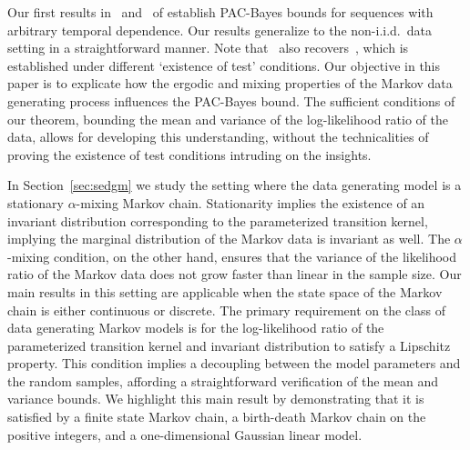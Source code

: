 \documentclass[11pt]{amsart}
\begin{document}
Our first results in~ and~ of  establish PAC-Bayes bounds for sequences with arbitrary temporal dependence. Our results generalize \cite[Theorem 2.4]{pierre} to the non-i.i.d.\ data setting in a straightforward manner. Note that~ also recovers~\cite[Theorem 3.3]{bhatta}, which is established under different `existence of test' conditions. Our objective in this paper is to explicate how the ergodic and mixing properties of the Markov data generating process influences the PAC-Bayes bound. The sufficient conditions of our theorem, bounding the mean and variance of the log-likelihood ratio of the data, allows for developing this understanding, without the technicalities of proving the existence of test conditions intruding on the insights. 

In Section~\ref{sec:sedgm} we study the setting where the data generating model is a stationary $\alpha$-mixing Markov chain. Stationarity implies the existence of an invariant distribution corresponding to the parameterized transition kernel, implying the marginal distribution of the Markov data is invariant as well. The $\alpha$-mixing condition, on the other hand, ensures that the variance of the likelihood ratio of the Markov data does not grow faster than linear in the sample size. Our main results in this setting are applicable when the state space of the Markov chain is either continuous or discrete. The primary requirement on the class of data generating Markov models is for the log-likelihood ratio of the parameterized transition kernel and invariant distribution to satisfy a Lipschitz property. This condition implies a decoupling between the model parameters and the random samples, affording a straightforward verification of the mean and variance bounds. We highlight this main result by demonstrating that it is satisfied by a finite state Markov chain, a birth-death Markov chain on the positive integers, and a one-dimensional Gaussian linear model. 
\end{document}
